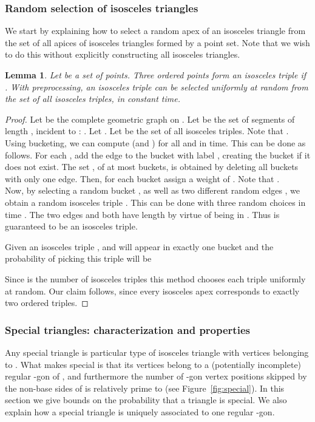 \documentclass{article}
\newtheorem{lemma}{Lemma}
\begin{document}
\subsubsection{Random selection of isosceles triangles}
\label{random}
We start by explaining how to select a random apex of an isosceles triangle from the set of all apices of isosceles
triangles formed by a point set.   Note that we wish to do this without explicitly constructing
all isosceles triangles.
\begin{lemma}
\label{lem:random}
Let  be a set of  points. Three ordered points  form an \emph{isosceles
triple} if .
With  preprocessing, an isosceles triple can be selected
uniformly at random from the set of all isosceles triples, in constant time.
\end{lemma}
\begin{proof}
Let  be the complete geometric graph on .
Let  be the set of segments of length , incident to  
:  .
 Let . Let  be the set of all isosceles triples.
Note that .\\

Using bucketing, we can compute  (and ) for all 
and  in  time.
This can be done as follows. For each ,
add the edge  to the bucket with label
, creating the bucket if it does not exist.
The set , of at most  buckets, is obtained by deleting all buckets with only one edge. Then, for each bucket  assign a
weight of . Note that . \\

Now, by selecting a random bucket , as well as two
different random edges , we obtain a random
 isosceles triple . This can be done with three
random choices in time . The two edges  and
 both have length  by virtue of being in
. Thus  is guaranteed to be an isosceles triple.

Given an isosceles triple ,  and
 will appear in exactly one bucket  and the probability of picking this triple will be



 \noindent Since   is the
number of isosceles triples this method chooses each triple
uniformly at random.  Our claim follows, since every isosceles apex corresponds to exactly
two ordered triples.
\end{proof}




\subsubsection{Special triangles:  characterization and properties}
\label{special}
Any special triangle  is particular type of isosceles triangle with vertices belonging to .
What makes  special is that its vertices belong to a (potentially incomplete) regular -gon of , and furthermore
the number of -gon vertex positions skipped by the non-base sides of  is relatively prime to  (see
Figure~\ref{fig:special}).
In this section we give bounds on the probability that a triangle is special. We also
explain how a special triangle is uniquely associated to one regular -gon.
\end{document}
